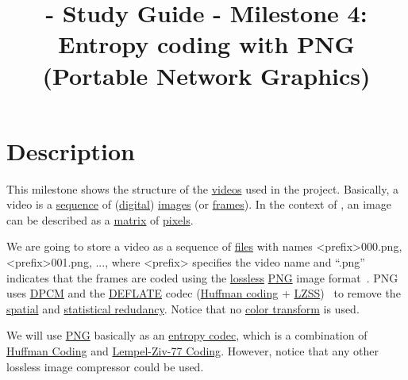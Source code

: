 
\title{\SM{} - Study Guide - Milestone 4: Entropy coding with PNG (Portable Network Graphics)}

\maketitle

\tableofcontents

\section{Description}

This milestone shows the structure of the
\href{https://en.wikipedia.org/wiki/Video}{videos} used in the
\theproject{} project. Basically, a video is a
\href{https://en.wikipedia.org/wiki/Sequence}{sequence} of
(\href{https://en.wikipedia.org/wiki/Digital_data}{digital})
\href{https://en.wikipedia.org/wiki/Image}{images} (or
\href{https://en.wikipedia.org/wiki/Film_frame}{frames}). In the
context of \theproject{}, an image can be described as a
\href{https://en.wikipedia.org/wiki/Matrix_(mathematics)}{matrix} of
\href{https://en.wikipedia.org/wiki/Pixel}{pixels}.

We are going to store a video as a sequence of
\href{https://en.wikipedia.org/wiki/Computer_file}{files} with names
<prefix>000.png, <prefix>001.png, ..., where <prefix> specifies the
video name and ``.png'' indicates that the frames are coded using the
\href{https://en.wikipedia.org/wiki/Lossless_compression}{lossless}
\href{https://en.wikipedia.org/wiki/Portable_Network_Graphics}{PNG}
image format~\cite{roelofs1999png}. PNG uses
\href{https://en.wikipedia.org/wiki/Differential_pulse-code_modulation}{DPCM}
and the \href{https://en.wikipedia.org/wiki/DEFLATE}{DEFLATE} codec
(\href{https://en.wikipedia.org/wiki/Huffman_coding}{Huffman coding} +
\href{https://en.wikipedia.org/wiki/Lempel-Ziv-Storer-Szymanski}{LZSS})~\cite{nelson96datacompression}
to remove the
\href{https://en.wikipedia.org/wiki/Image_compression}{spatial} and
\href{https://en.wikipedia.org/wiki/Data_compression}{statistical
  redudancy}. Notice that no
\href{https://en.wikipedia.org/wiki/YUV}{color transform} is used.

We will use \href{https://vicente-gonzalez-ruiz.github.io/PNG/}{PNG}
basically as an
\href{https://en.wikipedia.org/wiki/Entropy_encoding}{entropy codec},
which is a combination of
\href{https://vicente-gonzalez-ruiz.github.io/Huffman_coding/}{Huffman
  Coding} and
\href{https://vicente-gonzalez-ruiz.github.io/LZ77/}{Lempel-Ziv-77
  Coding}. However, notice that any other lossless image compressor
could be used.

